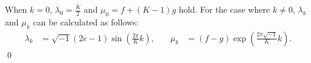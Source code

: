 \documentclass{article}
\theoremstyle{plain}
\begin{document}
When $k=0$, $\lambda_0 = \frac{K}{2}$ and $\mu_0 = f + (K-1)g$ hold. For the case where $k\neq 0$, $\lambda_k$ and $\mu_k$ can be calculated as follows:
\begin{align*}
	\lambda_k & = \sqrt{-1} (2e - 1) \sin\left( \frac{2\pi}{K} k \right)
	,         & \quad
	\mu_k     & = (f-g) \exp\left( \frac{2\pi \sqrt{-1}}{K} k \right)
	.
\end{align*}
\qed


\end{document}

